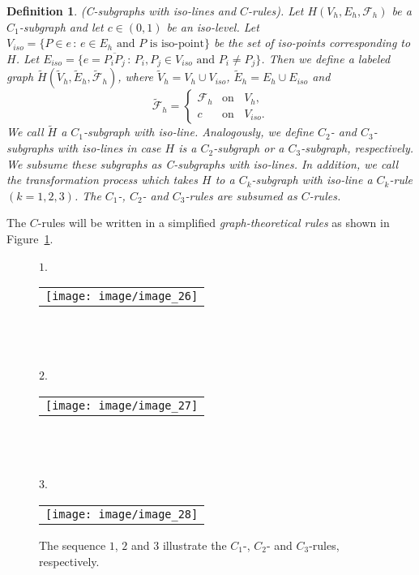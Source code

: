 \documentclass[a4paper,11pt]{article}
\newtheorem{definition}[theorem]{Definition}
\begin{document}
\begin{definition}(C-subgraphs with iso-lines and $C$-rules).
Let $H(V_h,E_h,\mathcal{F}_h)$ be a $C_1$-subgraph and let $c\in (0,1)$ be an iso-level.
Let $V_{iso}=\{P\in e\,:\,e\in E_h\mbox{ and } P\mbox{ is iso-point}\}$ be the set of iso-points
corresponding to $H$. Let $E_{iso}=\{e=\overline{P_iP_j}\,:\,P_i,P_j\in V_{iso}\mbox{ and } P_i\neq P_j\}$.
Then we define a labeled graph $\tilde{H}(\tilde{V}_h,\tilde{E}_h,\tilde{\mathcal{F}}_h)$, where
$\tilde{V}_h=V_h\cup V_{iso}$, $\tilde{E}_h=E_h\cup E_{iso}$ and
\begin{equation}
 \tilde{\mathcal{F}}_h=\left\{
   \begin{array}{ll}
     \mathcal{F}_h & \mbox{on }\;\; V_h, \\
     c & \mbox{on }\;\; V_{iso}.
   \end{array}\right.
\label{eq:iso-path-10}
\end{equation}
We call $\tilde{H}$ a $C_1$-subgraph with iso-line. Analogously, we define $C_2$- and
$C_3$-subgraphs with iso-lines in case $H$ is a $C_2$-subgraph or a $C_3$-subgraph, respectively.
We subsume these subgraphs as C-subgraphs with iso-lines. In addition, we call the transformation
process which takes $H$ to a $C_k$-subgraph with iso-line a $C_k$-rule $(k=1,2,3)$. The $C_1$-, $C_2$-
and $C_3$-rules are subsumed as $C$-rules.
\label{def:iso-path-23}
\end{definition}
\noindent The $C$-rules will be written in a simplified {\it graph-theoretical rules} as shown in
Figure~\ref{image_26_27_28}.
\begin{figure}[!ht]
$1$.
\begin{tabular}[c]{l}
\texttt{[image: image/image\_26]}
\end{tabular}\\ \\ \\

$2$.
\begin{tabular}[c]{l}
\texttt{[image: image/image\_27]}
\end{tabular}\\ \\ \\

$3$.
\begin{tabular}[c]{l}
\texttt{[image: image/image\_28]}
\end{tabular}
\caption{The sequence $1$, $2$ and $3$ illustrate the $C_1$-, $C_2$- and $C_3$-rules, respectively.}
\label{image_26_27_28}
\end{figure}
\end{document}
